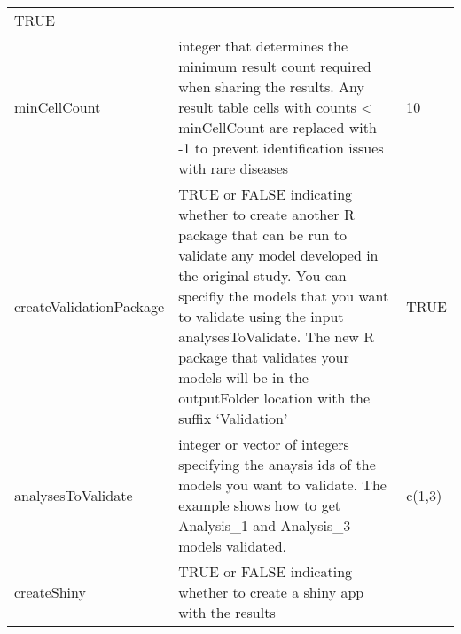 \documentclass[
]{article}
\begin{document}
\begin{longtable}[]{@{}lll@{}}
\begin{minipage}[t]{0.24\columnwidth}
TRUE\strut
\end{minipage}\tabularnewline
\begin{minipage}[t]{0.21\columnwidth}\raggedright
minCellCount\strut
\end{minipage} & \begin{minipage}[t]{0.46\columnwidth}\raggedright
integer that determines the minimum result count required when sharing
the results. Any result table cells with counts \textless{} minCellCount
are replaced with -1 to prevent identification issues with rare
diseases\strut
\end{minipage} & \begin{minipage}[t]{0.24\columnwidth}\raggedright
10\strut
\end{minipage}\tabularnewline
\begin{minipage}[t]{0.21\columnwidth}\raggedright
createValidationPackage\strut
\end{minipage} & \begin{minipage}[t]{0.46\columnwidth}\raggedright
TRUE or FALSE indicating whether to create another R package that can be
run to validate any model developed in the original study. You can
specifiy the models that you want to validate using the input
analysesToValidate. The new R package that validates your models will be
in the outputFolder location with the suffix `Validation'\strut
\end{minipage} & \begin{minipage}[t]{0.24\columnwidth}\raggedright
TRUE\strut
\end{minipage}\tabularnewline
\begin{minipage}[t]{0.21\columnwidth}\raggedright
analysesToValidate\strut
\end{minipage} & \begin{minipage}[t]{0.46\columnwidth}\raggedright
integer or vector of integers specifying the anaysis ids of the models
you want to validate. The example shows how to get Analysis\_1 and
Analysis\_3 models validated.\strut
\end{minipage} & \begin{minipage}[t]{0.24\columnwidth}\raggedright
c(1,3)\strut
\end{minipage}\tabularnewline
\begin{minipage}[t]{0.21\columnwidth}\raggedright
createShiny\strut
\end{minipage} & \begin{minipage}[t]{0.46\columnwidth}\raggedright
TRUE or FALSE indicating whether to create a shiny app with the results

\end{minipage}
\end{longtable}
\end{document}
